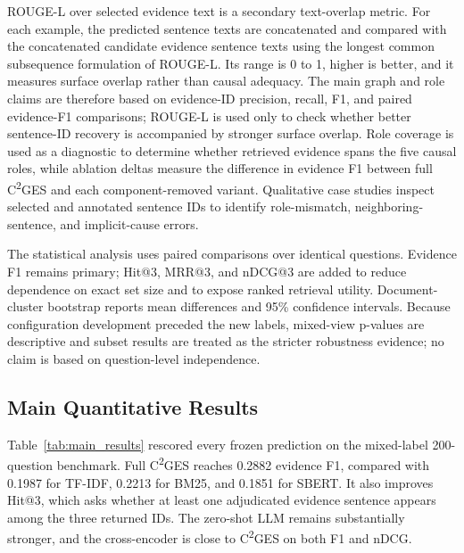 \documentclass{article}
\begin{document}
ROUGE-L over selected evidence text is a secondary text-overlap metric. For each example, the predicted sentence texts are concatenated and compared with the concatenated candidate evidence sentence texts using the longest common subsequence formulation of ROUGE-L. Its range is 0 to 1, higher is better, and it measures surface overlap rather than causal adequacy. The main graph and role claims are therefore based on evidence-ID precision, recall, F1, and paired evidence-F1 comparisons; ROUGE-L is used only to check whether better sentence-ID recovery is accompanied by stronger surface overlap. Role coverage is used as a diagnostic to determine whether retrieved evidence spans the five causal roles, while ablation deltas measure the difference in evidence F1 between full C\textsuperscript{2}GES and each component-removed variant. Qualitative case studies inspect selected and annotated sentence IDs to identify role-mismatch, neighboring-sentence, and implicit-cause errors.

The statistical analysis uses paired comparisons over identical questions. Evidence F1 remains primary; Hit@3, MRR@3, and nDCG@3 are added to reduce dependence on exact set size and to expose ranked retrieval utility. Document-cluster bootstrap reports mean differences and 95\% confidence intervals. Because configuration development preceded the new labels, mixed-view p-values are descriptive and subset results are treated as the stricter robustness evidence; no claim is based on question-level independence.

\subsection{Main Quantitative Results}
\label{sec:main_results}

Table~\ref{tab:main_results} rescored every frozen prediction on the mixed-label 200-question benchmark. Full C\textsuperscript{2}GES reaches 0.2882 evidence F1, compared with 0.1987 for TF-IDF, 0.2213 for BM25, and 0.1851 for SBERT. It also improves Hit@3, which asks whether at least one adjudicated evidence sentence appears among the three returned IDs. The zero-shot LLM remains substantially stronger, and the cross-encoder is close to C\textsuperscript{2}GES on both F1 and nDCG.
\end{document}
